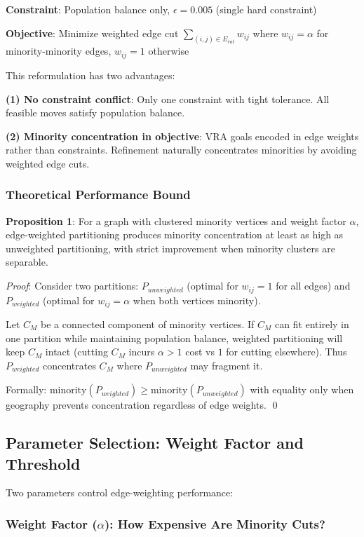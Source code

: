 \textbf{Constraint}: Population balance only, $\epsilon = 0.005$ (single hard constraint)

\textbf{Objective}: Minimize weighted edge cut $\sum_{(i,j) \in E_{cut}} w_{ij}$ where $w_{ij} = \alpha$ for minority-minority edges, $w_{ij} = 1$ otherwise

This reformulation has two advantages:

\textbf{(1) No constraint conflict}: Only one constraint with tight tolerance. All feasible moves satisfy population balance.

\textbf{(2) Minority concentration in objective}: VRA goals encoded in edge weights rather than constraints. Refinement naturally concentrates minorities by avoiding weighted edge cuts.

\subsubsection{Theoretical Performance Bound}

\textbf{Proposition 1}: For a graph with clustered minority vertices and weight factor $\alpha$, edge-weighted partitioning produces minority concentration at least as high as unweighted partitioning, with strict improvement when minority clusters are separable.

\textit{Proof}: Consider two partitions: $P_{unweighted}$ (optimal for $w_{ij} = 1$ for all edges) and $P_{weighted}$ (optimal for $w_{ij} = \alpha$ when both vertices minority).

Let $C_M$ be a connected component of minority vertices. If $C_M$ can fit entirely in one partition while maintaining population balance, weighted partitioning will keep $C_M$ intact (cutting $C_M$ incurs $\alpha > 1$ cost vs $1$ for cutting elsewhere). Thus $P_{weighted}$ concentrates $C_M$ where $P_{unweighted}$ may fragment it.

Formally: $\text{minority}(P_{weighted}) \geq \text{minority}(P_{unweighted})$ with equality only when geography prevents concentration regardless of edge weights. \qed

\subsection{Parameter Selection: Weight Factor and Threshold}

Two parameters control edge-weighting performance:

\subsubsection{Weight Factor ($\alpha$): How Expensive Are Minority Cuts?}

